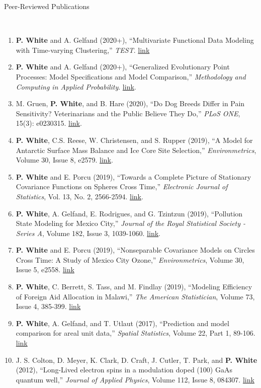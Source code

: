 \documentclass[12pt]{article}
\newcommand{\head}[1]{ %
    \bigskip %
    \begin{large}\begin{bf}{#1}\end{bf}\end{large} %

    \ \\ [-1.3cm] %

    \hrulefill}
\begin{document}
\vspace{2mm}
\head{Peer-Reviewed Publications}

\begin{enumerate}[label=$\bullet$]
\item \textbf{P. White} and A. Gelfand (2020+), ``Multivariate Functional Data Modeling with Time-varying Clustering,'' \textit{TEST}. \href{http://link.springer.com/article/10.1007/s11749-020-00733-z}{link}
\item \textbf{P. White} and A. Gelfand (2020+), ``Generalized Evolutionary Point Processes: Model Specifications and Model Comparison,'' \emph{Methodology and Computing in Applied Probability}. \href{https://doi.org/10.1007/s11009-020-09797-8}{link}.
\item M. Gruen, \textbf{P. White}, and B. Hare (2020), ``Do Dog Breeds Differ in Pain Sensitivity? Veterinarians and the Public Believe They Do,'' \emph{PLoS ONE}, 15(3): e0230315. \href{https://doi.org/10.1371/journal.pone.0230315}{link}.
\item \textbf{P. White}, C.S. Reese, W. Christensen, and S. Rupper (2019), ``A Model for Antarctic Surface Mass Balance and Ice Core Site Selection,'' \emph{Environmetrics}, Volume 30, Issue 8, e2579. \href{https://onlinelibrary.wiley.com/doi/abs/10.1002/env.2579}{link}.
\item \textbf{P. White} and E. Porcu (2019), ``Towards a Complete Picture of Stationary Covariance Functions on Spheres Cross Time,'' \emph{Electronic Journal of Statistics}, Vol. 13, No. 2, 2566-2594. \href{https://doi.org/10.1214/19-EJS1593}{link}.
\item \textbf{P. White}, A. Gelfand, E. Rodrigues, and G. Tzintzun (2019), ``Pollution State Modeling for Mexico City,'' \emph{Journal of the Royal Statistical Society - Series A}, Volume 182, Issue 3, 1039-1060. \href{https://rss.onlinelibrary.wiley.com/doi/abs/10.1111/rssa.12444}{link}.
\item \textbf{P. White} and E. Porcu (2019), ``Nonseparable Covariance Models on Circles Cross Time: A Study of Mexico City Ozone,'' \emph{Environmetrics}, Volume 30, Issue 5, e2558. \href{https://onlinelibrary.wiley.com/doi/full/10.1002/env.2558}{link}
\item \textbf{P. White}, C. Berrett, S. Tass, and M. Findlay (2019), ``Modeling Efficiency of Foreign Aid Allocation in Malawi,'' \emph{The American Statistician}, Volume 73, Issue 4, 385-399.  \href{https://www.tandfonline.com/doi/full/10.1080/00031305.2018.1470032}{link}
\item \textbf{P. White}, A. Gelfand, and T. Utlaut (2017), ``Prediction and model comparison for areal unit data,'' \emph{Spatial Statistics}, Volume 22, Part 1, 89-106. \href{http://www.sciencedirect.com/science/article/pii/S2211675317301422}{link}
\item J. S. Colton, D. Meyer, K. Clark, D. Craft, J. Cutler, T. Park, and \textbf{P. White} (2012), ``Long-Lived electron spins in a modulation doped (100) GaAs quantum well,'' \emph{Journal of Applied Physics}, Volume 112, Issue 8, 084307.  \href{http://aip.scitation.org/doi/abs/10.1063/1.4759320}{link}
\end{enumerate}
\end{document}
